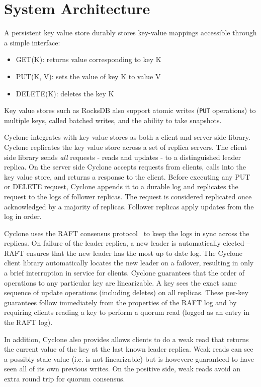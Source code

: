 \documentclass[letterpaper,twocolumn,10pt]{article}
\begin{document}
\section{System Architecture}
\label{sec:sysarch}
A persistent key value store durably stores key-value mappings accessible
through a simple interface:

\begin{itemize}
\item GET(K): returns value corresponding to key K
\item PUT(K, V): sets the value of key K to value V
\item DELETE(K): deletes the key K
\end{itemize}

Key value stores such as RocksDB also support atomic writes ({\tt PUT}
operations) to multiple keys, called batched writes, and the ability to take
snapshots.

Cyclone integrates with key value stores as both a client and server side
library. Cyclone replicates the key value store across a set of replica
servers. The client side library sends \emph{all} requests - reads and updates -
to a distinguished leader replica.  On the server side Cyclone accepts requests
from clients, calls into the key value store, and returns a response to the
client. Before executing any PUT or DELETE request, Cyclone appends it to a
durable log and replicates the request to the logs of follower replicas. The
request is considered replicated once acknowledged by a majority of
replicas. Follower replicas apply updates from the log in order.

Cyclone uses the RAFT consensus protocol~\cite{raft} to keep the logs
in sync across the replicas. On failure of the leader replica, a new
leader is automatically elected -- RAFT ensures that the new leader
has the most up to date log. The Cyclone client library automatically
locates the new leader on a failover, resulting in only a brief
interruption in service for clients.  Cyclone guarantees that the
order of operations to any particular key are linearizable. A key sees
the exact same sequence of update operations (including deletes) on
all replicas. These per-key guarantees follow immediately from the
properties of the RAFT log and by requiring clients reading a key to
perform a quorum read (logged as an entry in the RAFT log).

In addition, Cyclone also provides allows clients to do a weak read
that returns the current value of the key at the last known leader
replica. Weak reads can see a possibly stale value
(i.e. is not linearizable) but is howevere guaranteed to have seen all
of its own previous writes. On the positive side, weak reads avoid an
extra round trip for quorum consensus.
\end{document}

